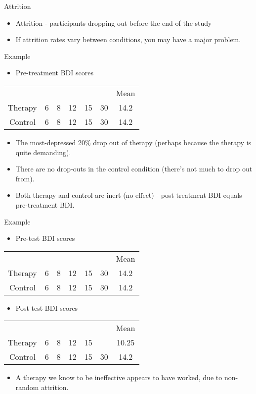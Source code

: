 \documentclass{beamer}
\begin{document}
\begin{frame}{Attrition}
\begin{itemize}
\item Attrition - participants dropping out before the end of the study
\item If attrition rates vary between conditions, you may have a major problem.
\end{itemize}
\end{frame}

\begin{frame}{Example}
\begin{itemize}
\item Pre-treatment BDI scores
\end{itemize}
\begin{tabular} {c c c c c c c}
 &  &  &  &  &  & Mean \\
Therapy	& 6 & 8	& 12 & 15 & 30 & 14.2 \\
Control	& 6 & 8	& 12 & 15 & 30 & 14.2 \\
\end{tabular} 
\vspace{12 pt}
\begin{itemize}
\item The most-depressed 20\% drop out of therapy (perhaps because the therapy is quite demanding).
\item There are no drop-outs in the control condition (there's not much to drop out from).
\item Both therapy and control are inert (no effect) - post-treatment BDI equals pre-treatment BDI.
\end{itemize}
\end{frame}

\begin{frame}{Example}
\begin{itemize}
\item Pre-test BDI scores
\end{itemize}
\begin{tabular} {c c c c c c c}
 &  &  &  &  &  & Mean \\
Therapy	& 6 & 8	& 12 & 15 & 30 & 14.2 \\
Control	& 6 & 8	& 12 & 15 & 30 & 14.2 \\
\end{tabular} 
\begin{itemize}
\item Post-test BDI scores
\end{itemize}
\begin{tabular} {c c c c c c c}
 &  &  &  &  &  & Mean \\
Therapy	& 6 & 8	& 12 & 15 &  & 10.25 \\
Control	& 6 & 8	& 12 & 15 & 30 & 14.2 \\
\end{tabular} 

\vspace{12 pt}
\begin{itemize}
\item A therapy we know to be ineffective appears to have worked, due to non-random attrition.
\end{itemize}
\end{frame}
\end{document}
